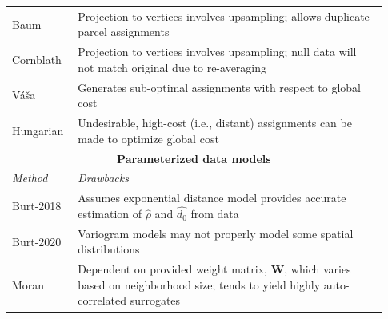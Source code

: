\documentclass[12pt,aps,pra,reprint,showkeys]{revtex4-1}
\begin{document}
\begin{table}[htp]
\begin{minipage}[c][\textheight][c]{\textwidth}
\begin{center}
\begin{tabular}{p{0.15\linewidth} p{0.78\linewidth}}
        Baum                      & Projection to vertices involves upsampling; allows duplicate parcel assignments                                                                    \\
        Cornblath                 & Projection to vertices involves upsampling; null data will not match original due to re-averaging                                                  \\
        V{\'a}{\v{s}}a            & Generates sub-optimal assignments with respect to global cost                                                                                      \\
        Hungarian                 & Undesirable, high-cost (i.e., distant) assignments can be made to optimize global cost                                                             \\\toprule
        \multicolumn{2}{c}{\textbf{Parameterized data models}}                                                                                                                         \\ \toprule
        \emph{Method}             & \emph{Drawbacks}                                                                                                                                   \\ \midrule
        Burt-2018                 & Assumes exponential distance model provides accurate estimation of $\hat{\rho}$ and $\hat{d_{0}}$ from data                                        \\
        Burt-2020                 & Variogram models may not properly model some spatial distributions                           \\
        Moran                     & Dependent on provided weight matrix, $\mathbf{W}$, which varies based on neighborhood size; tends to yield highly auto-correlated surrogates       \\
      \end{tabular}
    \end{center}
  \end{minipage}
\end{table}
\end{document}
